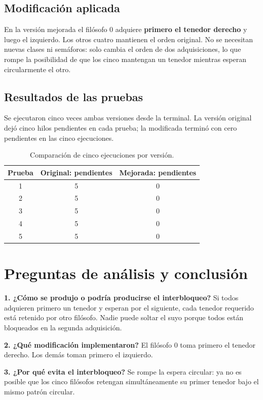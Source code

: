 \documentclass[12pt]{report}
\begin{document}
\section{Modificación aplicada}
En la versión mejorada el filósofo 0 adquiere \textbf{primero el tenedor derecho} y luego el izquierdo. Los otros cuatro mantienen el orden original. No se necesitan nuevas clases ni semáforos: solo cambia el orden de dos adquisiciones, lo que rompe la posibilidad de que los cinco mantengan un tenedor mientras esperan circularmente el otro.

\section{Resultados de las pruebas}
Se ejecutaron cinco veces ambas versiones desde la terminal. La versión original dejó cinco hilos pendientes en cada prueba; la modificada terminó con cero pendientes en las cinco ejecuciones.
\begin{table}[H]\centering\caption{Comparación de cinco ejecuciones por versión.}
\begin{tabular}{ccc}\toprule
Prueba & Original: pendientes & Mejorada: pendientes\\\midrule
1&5&0\\2&5&0\\3&5&0\\4&5&0\\5&5&0\\\bottomrule
\end{tabular}\end{table}

\chapter{Preguntas de análisis y conclusión}
\textbf{1. ¿Cómo se produjo o podría producirse el interbloqueo?} Si todos adquieren primero un tenedor y esperan por el siguiente, cada tenedor requerido está retenido por otro filósofo. Nadie puede soltar el suyo porque todos están bloqueados en la segunda adquisición.

\textbf{2. ¿Qué modificación implementaron?} El filósofo 0 toma primero el tenedor derecho. Los demás toman primero el izquierdo.

\textbf{3. ¿Por qué evita el interbloqueo?} Se rompe la espera circular: ya no es posible que los cinco filósofos retengan simultáneamente su primer tenedor bajo el mismo patrón circular.
\end{document}
